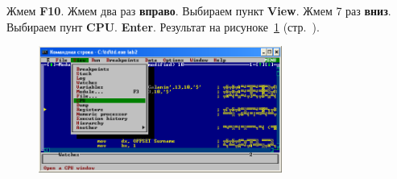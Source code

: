 Жмем \textbf{F10}. Жмем два раз \textbf{вправо}. Выбираем пункт \textbf{View}. Жмем 7 раз \textbf{вниз}. Выбираем пунт \textbf{CPU}. \textbf{Enter}. Результат на рисуноке~\ref{fig:task_4_9__td_View_CPU} (стр.~\pageref{fig:task_4_9__td_View_CPU}).

\begin{figure}[!htp]
    \centering
    \includegraphics[width=8cm]
        {../_INCLUDES/task-4-9/td-View-CPU.png}
    \caption{}
    \label{fig:task_4_9__td_View_CPU}
\end{figure}

